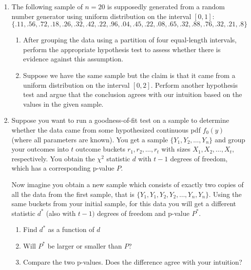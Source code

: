 \documentclass [12pt] {article}
\begin{document}
\begin{enumerate}

\item The following sample of $n=20$ is supposedly generated from a random number generator using uniform distribution on the interval $[0,1]$:
\[
\{.11, .56, .72, .18, .26, .32, .42, .22, .96, .04, .45, .22, .08, .65, .32, .88, .76, .32, .21, .8\}
\]

\begin{enumerate}
    \item After grouping the data using a partition of four equal-length intervals, perform the appropriate hypothesis test to assess whether there is evidence against this assumption.
    \item Suppose we have the same sample but the claim is that it came from a uniform distribution on the interval $[0,2]$. Perform another hypothesis test and argue that the conclusion agrees with our intuition based on the values in the given sample.
\end{enumerate} 

\item Suppose you want to run a goodness-of-fit test on a sample to determine whether the data came from some hypothesized continuous pdf $f_0(y)$ (where all parameters are known). You get a sample $\{Y_1, Y_2, \ldots, Y_n\}$ and group your outcomes into $t$ outcome buckets $r_1, r_2, \ldots, r_t$ with sizes $X_1, X_2, \ldots, X_t$, respectively. You obtain the $\chi^2$ statistic $d$ with $t-1$ degrees of freedom, which has a corresponding p-value $P$. 

Now imagine you obtain a new sample which consists of exactly two copies of all the data from the first sample, that is $\{Y_1, Y_1, Y_2, Y_2, \ldots, Y_n, Y_n\}$. Using the same buckets from your initial sample, for this data you will get a different statistic $d^*$ (also with $t-1)$ degrees of freedom and p-value $P^*$.

\begin{enumerate}
    \item Find $d^*$ as a function of $d$
    \item Will $P^*$ be larger or smaller than $P$?
    \item Compare the two p-values. Does the difference agree with your intuition? 
\end{enumerate}

\end{enumerate}
\end{document}
